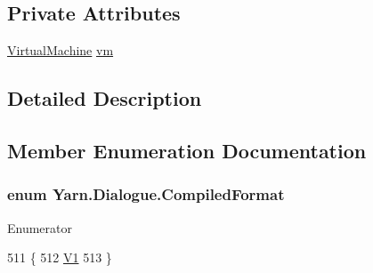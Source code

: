 \subsection*{Private Attributes}
\begin{DoxyCompactItemize}
\item 
\hyperlink{a00138}{Virtual\-Machine} \hyperlink{a00072_a8c1319357a9df6cff051328fb33224c7}{vm}
\end{DoxyCompactItemize}


\subsection{Detailed Description}


\subsection{Member Enumeration Documentation}
\hypertarget{a00072_a903f18cdcc66c28ceab5a43c41fe074d}{
\subsubsection[{Compiled\-Format}]{\setlength{\rightskip}{0pt plus 5cm}enum {\bf Yarn.\-Dialogue.\-Compiled\-Format}}}\label{a00072_a903f18cdcc66c28ceab5a43c41fe074d}
\begin{Desc}
\item[Enumerator]\par
\begin{description}
\item[{\em 
\hypertarget{a00072_a903f18cdcc66c28ceab5a43c41fe074dab4daca084ad9eabfc8de231929477ed6}{V1}\label{a00072_a903f18cdcc66c28ceab5a43c41fe074dab4daca084ad9eabfc8de231929477ed6}
}]\end{description}
\end{Desc}

\begin{DoxyCode}
511         \{
512             \hyperlink{a00072_a903f18cdcc66c28ceab5a43c41fe074dab4daca084ad9eabfc8de231929477ed6}{V1}
513         \}
\end{DoxyCode}


